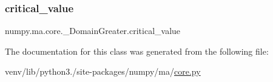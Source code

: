 \subsubsection{\texorpdfstring{critical\+\_\+value}{critical\_value}}
{\footnotesize\ttfamily numpy.\+ma.\+core.\+\_\+\+Domain\+Greater.\+critical\+\_\+value}



The documentation for this class was generated from the following file\+:\begin{DoxyCompactItemize}
\item 
venv/lib/python3./site-\/packages/numpy/ma/\hyperlink{numpy_2ma_2core_8py}{core.\+py}\end{DoxyCompactItemize}
